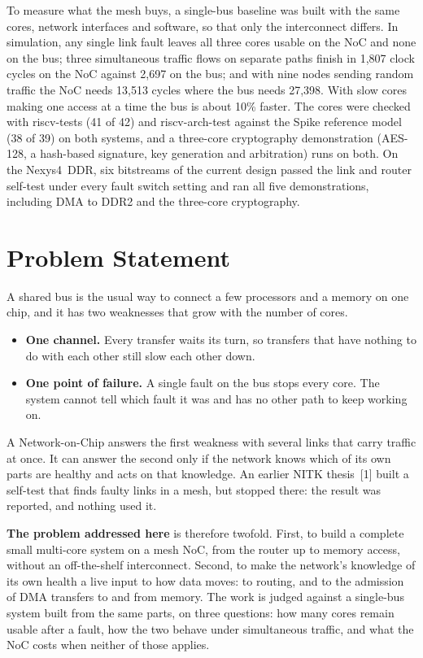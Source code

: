 \documentclass[11pt,a4paper]{article}
\begin{document}
To measure what the mesh buys, a single-bus baseline was built with the same
cores, network interfaces and software, so that only the interconnect differs.
In simulation, any single link fault leaves all three cores usable on the NoC
and none on the bus; three simultaneous traffic flows on separate paths finish
in 1,807 clock cycles on the NoC against 2,697 on the bus; and with nine nodes
sending random traffic the NoC needs 13,513 cycles where the bus needs 27,398.
With slow cores making one access at a time the bus is about 10\% faster. The cores were checked with
riscv-tests (41 of 42) and riscv-arch-test against the Spike reference model
(38 of 39) on both systems, and a three-core cryptography demonstration
(AES-128, a hash-based signature, key generation and arbitration) runs on
both. On the Nexys4~DDR, six bitstreams of the current design passed the
link and router self-test under every fault switch setting and ran all five
demonstrations, including DMA to DDR2 and the three-core cryptography.

\section{Problem Statement}

A shared bus is the usual way to connect a few processors and a memory on one
chip, and it has two weaknesses that grow with the number of cores.

\begin{itemize}
\item \textbf{One channel.} Every transfer waits its turn, so transfers that
have nothing to do with each other still slow each other down.
\item \textbf{One point of failure.} A single fault on the bus stops every
core. The system cannot tell which fault it was and has no other path to keep
working on.
\end{itemize}

A Network-on-Chip answers the first weakness with several links that carry
traffic at once. It can answer the second only if the network knows which of
its own parts are healthy and acts on that knowledge. An earlier NITK
thesis~[1] built a self-test that finds faulty links in a mesh, but stopped
there: the result was reported, and nothing used it.

\textbf{The problem addressed here} is therefore twofold. First, to build a
complete small multi-core system on a mesh NoC, from the router up to memory
access, without an off-the-shelf interconnect. Second, to make the network's
knowledge of its own health a live input to how data moves: to routing, and to
the admission of DMA transfers to and from memory. The work is judged against
a single-bus system built from the same parts, on three questions: how many
cores remain usable after a fault, how the two behave under simultaneous
traffic, and what the NoC costs when neither of those applies.
\end{document}
